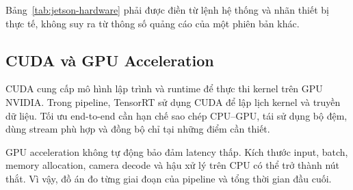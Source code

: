 Bảng~\ref{tab:jetson-hardware} phải được điền từ lệnh hệ thống và nhãn thiết bị
thực tế, không suy ra từ thông số quảng cáo của một phiên bản khác.

\subsection{CUDA và GPU Acceleration}

CUDA cung cấp mô hình lập trình và runtime để thực thi kernel trên GPU NVIDIA.
Trong pipeline, TensorRT sử dụng CUDA để lập lịch kernel và truyền dữ liệu. Tối
ưu end-to-end cần hạn chế sao chép CPU--GPU, tái sử dụng bộ đệm, dùng stream
phù hợp và đồng bộ chỉ tại những điểm cần thiết.

GPU acceleration không tự động bảo đảm latency thấp. Kích thước input, batch,
memory allocation, camera decode và hậu xử lý trên CPU có thể trở thành nút thắt.
Vì vậy, đồ án đo từng giai đoạn của pipeline và tổng thời gian đầu cuối.